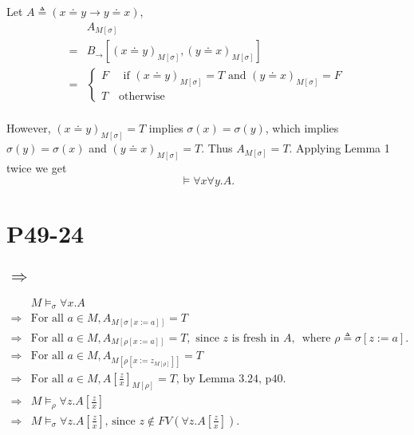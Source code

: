 \documentclass{article}
\begin{document}
Let $A \triangleq (x \doteq y \rightarrow y \doteq x)$, 
\begin{align*}
	 &A_{M[\sigma]}\\
	=&B_\rightarrow[(x \doteq y)_{M[\sigma]}, (y \doteq x) _{M[\sigma]}]\\
	=&\begin{cases}
		F \quad \mbox{ if } (x \doteq y)_{M[\sigma]} = T \mbox{ and } (y \doteq x)_{M[\sigma]} = F\\
		T \quad \mbox{otherwise}%
	 \end{cases}\\
\end{align*}

However, $(x\doteq y)_{M[\sigma]} = T$ implies $\sigma(x) = \sigma(y)$, which implies $\sigma(y) = \sigma(x)$ and $(y \doteq x)_{M[\sigma]} = T$. Thus $A _{M[\sigma]} = T$. Applying Lemma 1 twice we get $$\models \forall x \forall y. A.$$ 

\section{P49-24}
\subsection*{$\Rightarrow$}
\begin{align*}
	& M\models _\sigma \forall x. A\\
	\Rightarrow & \text{For all }a \in M, A_{M[\sigma[x:=a]]} = T\\
	\Rightarrow & \text{For all }a \in M, A_{M[\rho[x:=a]]} = T, \text{ since $z$ is fresh in $A$, } \text{ where $\rho \triangleq \sigma[z:=a]$. } \\
	\Rightarrow & \text{For all }a \in M, A_{M[\rho[x := z_{M[\rho]}]]} = T\\
	\Rightarrow & \text{For all }a \in M, A[\frac{z}{x}]_{M[\rho]} = T \text{, by Lemma 3.24, p40. }  \\
	\Rightarrow &M\models _\rho\forall z. A[\frac{z}{x}] \\
	\Rightarrow &M\models _\sigma\forall z. A[\frac{z}{x}] \text{, since $z \notin FV(\forall z. A[\frac{z}{x}])$. }
\end{align*}
\end{document}
